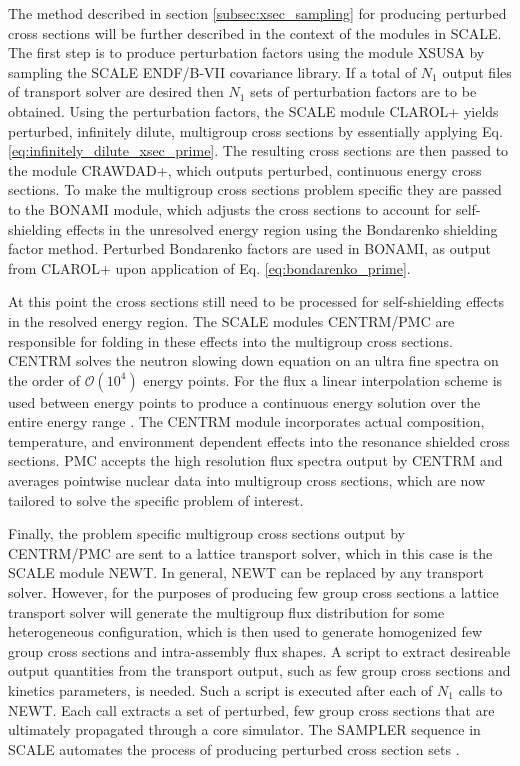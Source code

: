 The method described in section \ref{subsec:xsec_sampling} for producing perturbed cross sections will be further described in the context of the modules in \ac{SCALE}. The first step is to produce perturbation factors using the module XSUSA by sampling the \ac{SCALE} \ac{ENDF}/B-VII covariance library. If a total of $N_1$ output files of transport solver are desired then $N_1$ sets of perturbation factors are to be obtained. Using the perturbation factors, the \ac{SCALE} module CLAROL+ yields perturbed, infinitely dilute, multigroup cross sections by essentially applying Eq. \ref{eq:infinitely_dilute_xsec_prime}. The resulting cross sections are then passed to the module CRAWDAD+, which outputs perturbed, continuous energy cross sections. To make the multigroup cross sections problem specific they are passed to the BONAMI module, which adjusts the cross sections to account for self-shielding effects in the unresolved energy region using the Bondarenko shielding factor method. Perturbed Bondarenko factors are used in BONAMI, as output from CLAROL+ upon application of Eq. \ref{eq:bondarenko_prime}.

At this point the cross sections still need to be processed for self-shielding effects in the resolved energy region. The \ac{SCALE} modules CENTRM/PMC are responsible for folding in these effects into the multigroup cross sections. CENTRM solves the neutron slowing down equation on an ultra fine spectra on the order of $\mathcal{O}(10^4)$ energy points. For the flux a linear interpolation scheme is used between energy points to produce a continuous energy solution over the entire energy range \cite{Williams_Gehin}. The CENTRM module incorporates actual composition, temperature, and environment dependent effects into the resonance shielded cross sections. PMC accepts the high resolution flux spectra output by CENTRM and averages pointwise nuclear data into multigroup cross sections, which are now tailored to solve the specific problem of interest.              

Finally, the problem specific multigroup cross sections output by CENTRM/PMC are sent to a lattice transport solver, which in this case is the \ac{SCALE} module NEWT. In general, NEWT can be replaced by any transport solver. However, for the purposes of producing few group cross sections a lattice transport solver will generate the multigroup flux distribution for some heterogeneous configuration, which is then used to generate homogenized few group cross sections and intra-assembly flux shapes. A script to extract desireable output quantities from the transport output, such as few group cross sections and kinetics parameters, is needed. Such a script is executed after each of $N_1$ calls to NEWT. Each call extracts a set of perturbed, few group cross sections that are ultimately propagated through a core simulator. The SAMPLER sequence in \ac{SCALE} automates the process of producing perturbed cross section sets \cite{Williams_Ilas}.      

